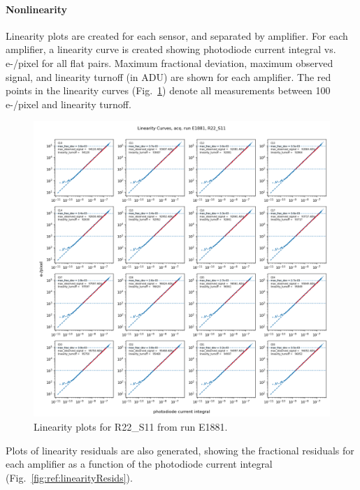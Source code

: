 \paragraph{Nonlinearity}

Linearity plots are created for each sensor, and separated by amplifier. For each amplifier, a linearity curve is created showing photodiode current integral vs. e-/pixel for all flat pairs. Maximum fractional deviation, maximum observed signal, and linearity turnoff (in ADU) are shown for each amplifier. The red points in the linearity curves (Fig.~\ref{fig:ref:linearity}) denote all measurements between 100 e-/pixel and linearity turnoff.

\begin{figure}
    \centering
    \includegraphics[width=0.8\linewidth]{figures/ReferenceFigures/linearity_fit_plot_LSSTCam_R22_S11_u_lsstccs_eo_linearity_plots_E1881_w_2024_35_20241105T131453Z.png}
    \caption{Linearity plots for R22\_S11 from run E1881.}
    \label{fig:ref:linearity}
\end{figure}
\clearpage
Plots of linearity residuals are also generated, showing the fractional residuals for each amplifier as a function of the photodiode current integral (Fig.~\ref{fig:ref:linearityResids}).

